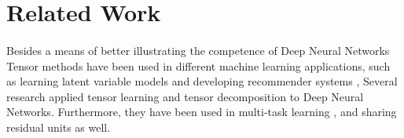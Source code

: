 \documentclass{report}
\begin{document}
\section{Related Work}
\paragraph*{}
Besides a means of better illustrating the competence of Deep Neural Networks
\cite{anim4}
Tensor methods have been used in different machine learning applications, such as learning latent variable models
\cite{anim1} and developing recommender systems
\cite{anim10},
Several research applied tensor learning
\cite{anim17}
and tensor decomposition
\cite{anim9,anim15} to Deep Neural Networks. Furthermore, they have been used in multi-task learning 
\cite{anim20}, and sharing residual
units
\cite{anim3} as well.
\end{document}
